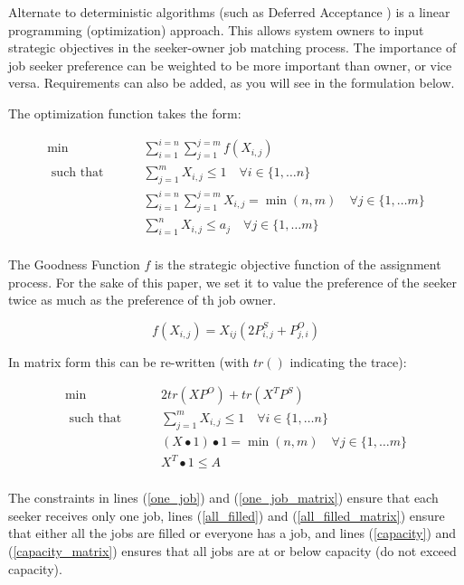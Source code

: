 Alternate to deterministic algorithms (such as Deferred Acceptance \cite{1962_Gale}) is a linear programming (optimization) approach. This allows system owners to input strategic objectives in the seeker-owner job matching process. The importance of job seeker preference can be weighted to be more important than owner, or vice versa. Requirements can also be added, as you will see in the formulation below.

The optimization function takes the form:

\begin{align}
\min \qquad & \sum_{i = 1}^{i=n} \sum_{j = 1}^{j=m} f(X_{i,j}) \\
\text{ such that } \qquad & \sum_{j=1}^m X_{i,j} \leq 1 \quad  \forall i \in \{1, \dots n\} \label{one_job}\\
& \sum_{i = 1}^{i=n} \sum_{j = 1}^{j=m}X_{i,j} = \min(n,m) \quad  \forall j \in \{1, \dots m\}  \label{all_filled}\\
& \sum_{i=1}^n X_{i,j} \leq a_j \quad  \forall j \in \{1, \dots m\} \label{capacity} \\
\end{align}

The Goodness Function $f$ is the strategic objective function of the assignment process. For the sake of this paper, we set it to value the preference of the seeker twice as much as the preference of th job owner.

\[f(X_{i,j}) = X_{ij}(2P^S_{i,j} + P^O_{j,i})\]

In matrix form this can be re-written (with $tr()$ indicating the trace):

\begin{align}
\min \qquad & 2tr(XP^O) + tr(X^TP^S) \\
\text{ such that } \qquad & \sum_{j=1}^m X_{i,j} \leq 1 \quad  \forall i \in \{1, \dots n\}  \label{one_job_matrix}\\
& (X \bullet 1)\bullet 1 = \min(n,m) \quad  \forall j \in \{1, \dots m\} \label{all_filled_matrix}\\
& X^T \bullet 1 \leq A \label{capacity_matrix} \\
\end{align}

The constraints in lines (\ref{one_job}) and (\ref{one_job_matrix}) ensure that each seeker receives only one job, lines (\ref{all_filled}) and (\ref{all_filled_matrix}) ensure that either all the jobs are filled or everyone has a job, and lines (\ref{capacity}) and (\ref{capacity_matrix}) ensures that all jobs are at or below capacity (do not exceed capacity).

